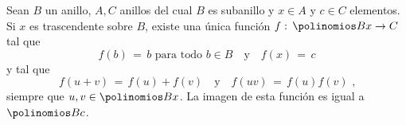 
\begin{teoPolinomios}\label{teo:polinomios:trascendente}
	Sean $B$ un anillo, $A,C$ anillos del cual $B$ es subanillo y
	$x\in A$ y $c\in C$ elementos.
	Si $x$ es trascendente sobre $B$, existe una \'unica funci\'on
	$f:\,\polinomios B x\rightarrow C$ tal que
	\begin{displaymath}
		f(b)\,=\,b\text{ para todo }b\in B
			\quad\text{y}\quad f(x)\,=\,c
	\end{displaymath}
	y tal que 
	\begin{displaymath}
		f(u+v)\,=\,f(u)+f(v)\quad\text{y}\quad f(uv)\,=\,f(u)f(v)
		\text{ ,}
	\end{displaymath}
	siempre que $u,v\in\polinomios B x$. La imagen de esta funci\'on
	es igual a $\polinomios B c$.
\end{teoPolinomios}


